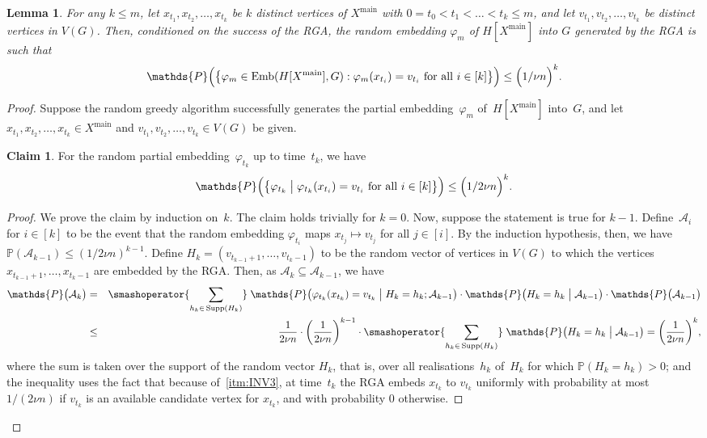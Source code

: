 \documentclass[final]{article}
\newtheorem{lemma}[theorem]{Lemma}
\theoremstyle{definition}
\newtheorem{claim}{Claim}[theorem]
\newcommand{\main}{\mathrm{main}}
\newcommand{\Emb}{\mathrm{Emb}}
\DeclareMathOperator{\supp}{Supp}
\newcommand{\oldqed}{}
\def\endofClaim{\hfill\scalebox{.6}{$\Box$}}
\newenvironment{claimproof}[1][Proof]{
  \renewcommand{\oldqed}{\qedsymbol}
  \renewcommand{\qedsymbol}{\endofClaim}
  \begin{proof}[#1]}
  {\end{proof}
  \renewcommand{\qedsymbol}{\oldqed}}
\begin{document}
\begin{lemma}
    \label{lem:v_main_vtx_spread}
    For any $k \leq m$, let $x_{t_1}, x_{t_2}, \dots, x_{t_k}$ be $k$ distinct vertices of $X^{\main}$ with $0 = t_0 < t_1 < \dots < t_k \leq m$, and let $v_{t_1}, v_{t_2}, \dots, v_{t_k}$ be distinct vertices in $V(G)$. Then, conditioned on the success of the RGA, the random embedding $\varphi_m$ of $H[X^{\main}]$ into $G$ generated by the RGA is such that 
    \[ \mathds{P}\Bigl(\bigl\{ \varphi_m \in \Emb(H[X^{\main}], G): \varphi_m (x_{t_i}) = v_{t_i} \text{ for all } i \in [k]\bigr\}\Bigr) \leq \Bigl( 1/{\nu n}\Bigr)^k.\]
\end{lemma}
\begin{proof}
    Suppose the random greedy algorithm successfully generates the partial embedding~$\varphi_m$ of~$H[X^{\main}]$ into~$G$, and let $x_{t_1}, x_{t_2}, \dots, x_{t_k} \in X^{\main}$ and $v_{t_1}, v_{t_2}, \dots, v_{t_k} \in V(G)$ be given. 
    \begin{claim}
    \label{clm:RGA_vtx_spread}
        For the random partial embedding~$\varphi_{t_k}$ up to time~$t_k$, we have 
        \[ \mathds{P}\Bigl(\bigl\{ \varphi_{t_k}\bigm| \varphi_{t_k}(x_{t_i}) = v_{t_i} \text{ for all } i \in [k]\bigr\}\Bigr) \leq \Bigl( 1/2\nu n \Bigr)^k.\]
    \end{claim}

    \begin{claimproof}
    We prove the claim by induction on~$k$. The claim holds trivially for $k = 0$. Now, suppose the statement is true for $k-1$.  
    Define~$\mathcal{A}_i$ for $i \in [k]$ to be the event that the random embedding $\varphi_{t_i}$ maps $x_{t_j} \mapsto v_{t_j}$ for all $j \in [i]$. 
    By the induction hypothesis, then, we have $\mathds{P}(\mathcal{A}_{k-1}) \leq (1/2\nu n)^{k-1}$. 
    Define $H_k = (v_{t_{k-1}+1}, \dots, v_{t_k-1})$ to be the random vector of vertices in $V(G)$ to which the vertices $x_{t_{k-1}+1}, \dots, x_{t_k-1}$ are embedded by the RGA. Then, as $\mathcal{A}_k \subseteq \mathcal{A}_{k-1}$, we have
    \begin{eqnarray*}
        \mathds{P}\bigl(\mathcal{A}_k\bigr) &=& 
        \smashoperator{\sum_{h_k \in\, \supp(H_k)}}
        \;\mathds{P}\bigl(\varphi_{t_k}(x_{t_k}) = v_{t_k} \bigm| H_k = h_k;  \mathcal{A}_{k-1}\bigr)
        \cdot\mathds{P}\bigl(H_k = h_k \bigm| \mathcal{A}_{k-1}\bigr)\cdot \mathds{P}\bigl(\mathcal{A}_{k-1}\bigr)\\
        &\leq& \frac{1}{2\nu n}\cdot \biggl(\frac{1}{2\nu n}\biggr)^{k-1} \cdot \smashoperator{\sum_{h_k \in \, \supp(H_k)}} \; \mathds{P}\bigl(H_k = h_k \bigm| \mathcal{A}_{k-1}\bigr) = \biggl(\frac{1}{2\nu n}\biggr)^k,
    \end{eqnarray*}
    where the sum is taken over the support of the random vector $H_k$, that is, over all realisations~$h_k$ of~$H_k$ for which $\mathds{P}(H_k = h_k) >0$; and the inequality uses the fact that because of~\ref{itm:INV3}, at time~$t_k$ the RGA embeds $x_{t_k}$ to $v_{t_k}$ uniformly with probability at most $1/(2\nu n)$ if $v_{t_k}$ is an available candidate vertex for $x_{t_k}$, and with probability $0$ otherwise. 
\end{claimproof}
    

\end{proof}
\end{document}
